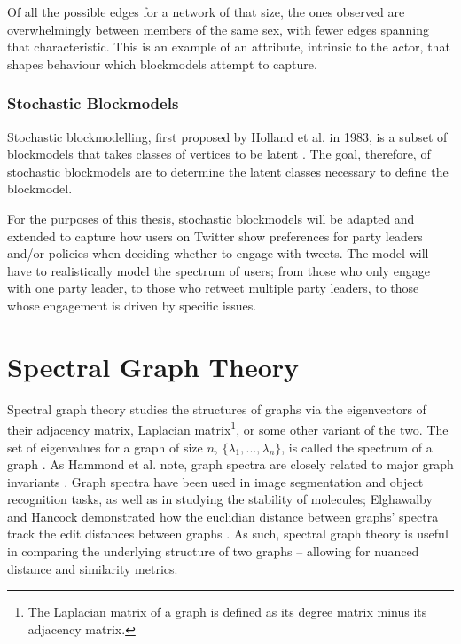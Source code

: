 Of all the possible edges for a network of that size, the ones observed are
overwhelmingly between members of the same sex, with fewer edges spanning that
characteristic. This is an example of an attribute, intrinsic to the actor, that
shapes behaviour which blockmodels attempt to capture. 

\subsubsection{Stochastic Blockmodels}

Stochastic blockmodelling, first proposed by Holland et al. in 1983, is a subset
of blockmodels that takes classes of vertices to be latent
\cite{holland1983stochastic}. The goal, therefore, of stochastic blockmodels are
to determine the latent classes necessary to define the blockmodel. 

For the purposes of this thesis, stochastic blockmodels will be adapted and
extended to capture how users on Twitter show preferences for party leaders
and/or policies when deciding whether to engage with tweets. The model will have
to realistically model the spectrum of users; from those who only engage with
one party leader, to those who retweet multiple party leaders, to those whose
engagement is driven by specific issues. 

\section{Spectral Graph Theory}\label{sec:spectralGraphTheory}

Spectral graph theory studies the structures of graphs via the eigenvectors of
their adjacency matrix, Laplacian matrix\footnote{The Laplacian matrix of a
graph is defined as its degree matrix minus its adjacency matrix.}, or some
other variant of the two. The set of eigenvalues for a graph of size $n$,
$\{\lambda_{1},...,\lambda_{n}\}$, is called the spectrum of a graph
\cite{netlsd}. As Hammond et al. note, graph spectra are closely related to
major graph invariants \cite{chung1997spectral}. Graph spectra have been used in
image segmentation and object recognition tasks, as well as in studying the
stability of molecules; Elghawalby and Hancock demonstrated how the euclidian
distance between graphs' spectra track the edit distances between graphs
\cite{elghawalby2008measuring,chung1997spectral}. As such, spectral graph theory
is useful in comparing the underlying structure of two graphs -- allowing for
nuanced distance and similarity metrics.   

